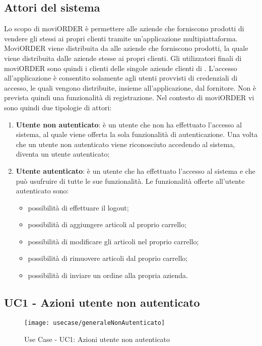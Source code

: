 \subsection{Attori del sistema}

Lo scopo di moviORDER è permettere alle aziende che forniscono prodotti di vendere gli stessi ai propri clienti tramite un'applicazione multipiattaforma. MoviORDER viene distribuita da \visione{} alle aziende che forniscono prodotti, la quale viene distribuita dalle aziende stesse ai propri clienti. Gli utilizzatori finali di moviORDER sono quindi i clienti delle singole aziende clienti di \visione{}.
L'accesso all'applicazione è consentito solamente agli utenti provvisti di credenziali di accesso, le quali vengono distribuite, insieme all'applicazione, dal fornitore. Non è prevista quindi una funzionalità di registrazione. Nel contesto di moviORDER vi sono quindi due tipologie di attori:
\begin{enumerate}
	\item \textbf{Utente non autenticato}: è un utente che non ha effettuato l'accesso al sistema, al quale viene offerta la sola funzionalità di autenticazione. Una volta che un utente non autenticato viene riconosciuto accedendo al sistema, diventa un utente autenticato;
	\item \textbf{Utente autenticato}: è un utente che ha effettuato l'accesso al sistema e che può usufruire di tutte le sue funzionalità. Le funzionalità offerte all'utente autenticato sono:
	\begin{itemize}
		\item possibilità di effettuare il logout;
		\item possibilità di aggiungere articoli al proprio carrello;
		\item possibilità di modificare gli articoli nel proprio carrello;
		\item possibilità di rimuovere articoli dal proprio carrello;
		\item possibilità di inviare un ordine alla propria azienda.
	\end{itemize}
\end{enumerate}

\subsection{UC1 - Azioni utente non autenticato}

\begin{figure}[!h] 
    \centering 
    \texttt{[image: usecase/generaleNonAutenticato]} 
    \caption{Use Case - UC1: Azioni utente non autenticato}
\end{figure}

